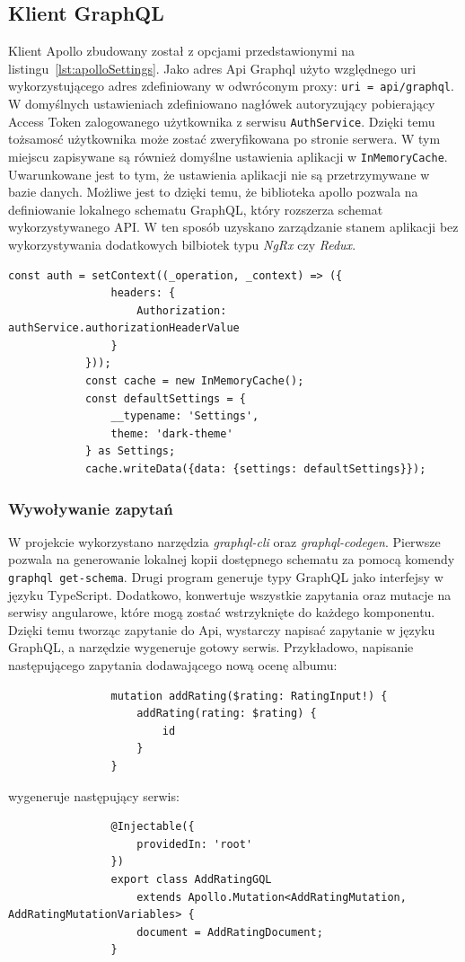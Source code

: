 	\subsection{Klient GraphQL}
		Klient Apollo zbudowany został z opcjami przedstawionymi na listingu~\ref{lst:apolloSettings}.
		Jako adres Api Graphql użyto względnego uri wykorzystującego adres zdefiniowany w odwróconym proxy: \verb|uri = api/graphql|.
		W domyślnych ustawieniach zdefiniowano nagłówek autoryzujący pobierający Access Token zalogowanego użytkownika z serwisu \verb|AuthService|.
		Dzięki temu tożsamosć użytkownika może zostać zweryfikowana po stronie serwera.
		W tym miejscu zapisywane są również domyślne ustawienia aplikacji w \verb|InMemoryCache|.
		Uwarunkowane jest to tym, że ustawienia aplikacji nie są przetrzymywane w bazie danych.
		Możliwe jest to dzięki temu, że biblioteka apollo pozwala na definiowanie lokalnego schematu GraphQL, który rozszerza schemat wykorzystywanego API.
		W ten sposób uzyskano zarządzanie stanem aplikacji bez wykorzystywania dodatkowych bilbiotek typu \emph{NgRx} czy \emph{Redux}.
		\begin{lstlisting}[label=lst:apolloSettings, caption=Globalne ustawienia modułu Apollo, float=h]
			const auth = setContext((_operation, _context) => ({
				headers: {
					Authorization: authService.authorizationHeaderValue
				}
			}));
			const cache = new InMemoryCache();			
			const defaultSettings = {
				__typename: 'Settings',
				theme: 'dark-theme'
			} as Settings;
			cache.writeData({data: {settings: defaultSettings}});
		\end{lstlisting}

		\subsubsection*{Wywoływanie zapytań}
			W projekcie wykorzystano narzędzia \emph{graphql-cli} oraz \emph{graphql-codegen}.
			Pierwsze pozwala na generowanie lokalnej kopii dostępnego schematu za pomocą komendy \verb|graphql get-schema|.
			Drugi program generuje typy GraphQL jako interfejsy w języku TypeScript.
			Dodatkowo, konwertuje wszystkie zapytania oraz mutacje na serwisy angularowe, które mogą zostać wstrzyknięte do każdego komponentu.
			Dzięki temu tworząc zapytanie do Api, wystarczy napisać zapytanie w języku GraphQL, a narzędzie wygeneruje gotowy serwis.
			Przykładowo, napisanie następującego zapytania dodawającego nową ocenę albumu:
			\begin{lstlisting}
				mutation addRating($rating: RatingInput!) {
					addRating(rating: $rating) {
						id
					}
				}
			\end{lstlisting}
			wygeneruje następujący serwis:
			\begin{lstlisting}
				@Injectable({
					providedIn: 'root'
				})
				export class AddRatingGQL
					extends Apollo.Mutation<AddRatingMutation, AddRatingMutationVariables> {
					document = AddRatingDocument;
				}
			\end{lstlisting}

